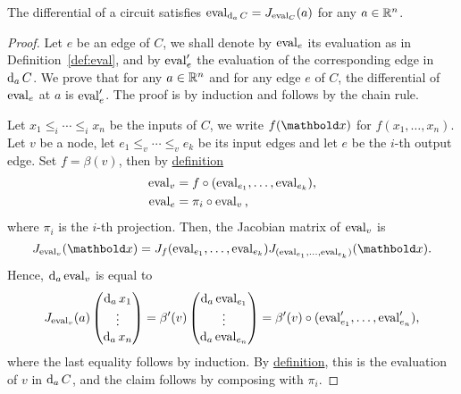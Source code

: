 \begin{proposition}
  The differential of a circuit satisfies $\operatorname{eval}_{\operatorname{d}_aC}=J_{\operatorname{eval}_C}(a)$ for any $a\in\mathbb{R}^n$.
\end{proposition}
\begin{proof}
  Let $e$ be an edge of $C$, we shall denote by $\operatorname{eval}_e$ its
  evaluation as in Definition~\ref{def:eval}, and by $\operatorname{eval}_e'$ the
  evaluation of the corresponding edge in $\operatorname{d}_a C$.  We prove that
  for any $a\in\mathbb{R}^n$ and for any edge $e$ of $C$, the differential of
  $\operatorname{eval}_e$ at $a$ is $\operatorname{eval}_e'$.  The proof is by induction and
  follows by the chain rule.

  Let $x_1\le_i\cdots\le_ix_n$ be the inputs of $C$, we write
  $f(\lst{x})$ for $f(x_1,\ldots,x_n)$.  Let $v$ be a node, let
  $e_1\le_v\cdots\le_ve_k$ be its input edges and let $e$ be the
  $i$-th output edge. Set $f=\beta(v)$, then by
  \hyperref[def:eval]{definition}
  \begin{equation}
    \label{eq:266}
    \begin{aligned}
      \operatorname{eval}_v &= f \circ (\operatorname{eval}_{e_1},\ldots,\operatorname{eval}_{e_k})\text{,}\\
      \operatorname{eval}_e &= \pi_i\circ\operatorname{eval}_v \text{,}
    \end{aligned}
  \end{equation}
  where $\pi_i$ is the $i$-th projection. Then, the Jacobian matrix of
  $\operatorname{eval}_v$ is
  \begin{equation}
    \label{eq:267}
    J_{\eval_v}(\lst{x}) =
    J_f(\eval_{e_1},\ldots,\eval_{e_k}) J_{(\eval_{e_1},\ldots,\eval_{e_k})} (\lst{x})
    \text{.}
  \end{equation}
  Hence, $\operatorname{d}_a \operatorname{eval}_v$ is equal to
  \begin{equation}
    \label{eq:268}
    J_{\operatorname{eval}_v}(a)
    \begin{pmatrix}
      \operatorname{d}_{a} x_1\\\vdots\\\operatorname{d}_{a} x_n
    \end{pmatrix} =
    \beta'(v)
    \begin{pmatrix}
      \operatorname{d}_a \operatorname{eval}_{e_1}\\\vdots\\\operatorname{d}_a \operatorname{eval}_{e_n}
    \end{pmatrix} =
    \beta'(v)\circ (\operatorname{eval}_{e_1}',\ldots,\operatorname{eval}_{e_n}')
    \text{,}
  \end{equation}
  where the last equality follows by induction. By
  \hyperref[def:eval]{definition}, this is the evaluation of $v$ in
  $\operatorname{d}_{a} C$, and the claim follows by composing with $\pi_i$.
\end{proof}

